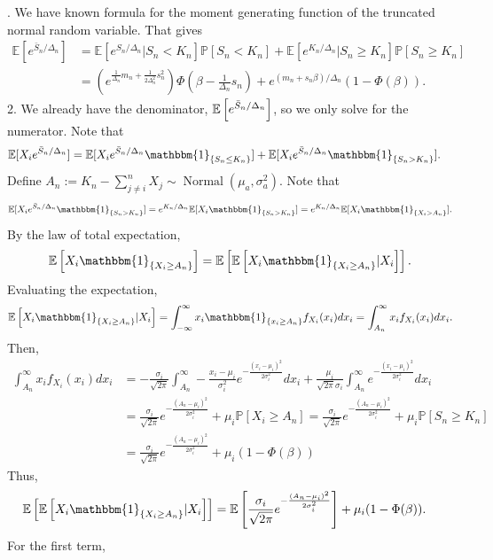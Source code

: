 \documentclass[fleqn,mnsc,nonblindrev]{informs4}
\newcommand{\ex}[1]{\mathbb{E}\left[#1\right]}
\newcommand{\Normal}{\operatorname{Normal}}
\newcommand{\EE}{\mathbb{E}}
\newcommand{\prob}[1]{\mathbb{P}[#1]}
\begin{document}
. We have known formula for the moment generating function of the truncated normal random variable. That gives
\begin{align*}
\EE[e^{\bar{S}_n/\Delta_n}]&=\mathbb{E}\left[e^{S_n/\Delta_n}|S_n<K_n\right]\mathbb{P}[S_n<K_n]+\mathbb{E}\left[e^{K_n/\Delta_n}|S_n\geq K_n\right]\mathbb{P}[S_n\geq K_n]\\
&=\left(e^{\frac{1}{\Delta_{n}}m_n+\frac{1}{2\Delta_{n}^2}s_{n}^2}\right)\Phi\left(\beta-\frac{1}{\Delta_{n}}s_{n}\right)+e^{(m_n+s_n\beta)/\Delta_n}(1-\Phi(\beta)).
\end{align*}
2. We already have the denominator, $\ex{e^{\Bar{S}_n/\Delta_n}}$, so we only solve for the numerator. Note that
\begin{align*}
\EE[X_i e^{\bar{S}_n/\Delta_n}]&=\EE[X_i e^{\bar{S}_n/\Delta_n}\mathbbm{1}_{\{S_n\leq K_n\}}]+\EE[X_i e^{\bar{S}_n/\Delta_n}\mathbbm{1}_{\{S_n>K_n\}}].
\end{align*}
Define $A_n:=K_n-\sum_{j\neq i}^nX_j\sim\Normal(\mu_a,\sigma_a^2)$. Note that
\[
\EE[X_i e^{\bar{S}_n/\Delta_n}\mathbbm{1}_{\{S_n>K_n\}}]=e^{K_n/\Delta_n}\EE[X_i\mathbbm{1}_{\{S_n>K_n\}}]=e^{K_n/\Delta_n}\EE[X_i\mathbbm{1}_{\{X_i>A_n\}}].
\]
By the law of total expectation,
\[
\ex{X_i\mathbbm{1}_{\{X_i\geq A_n\}}}=\ex{\ex{X_i\mathbbm{1}_{\{X_i\geq A_n\}}|X_i}}.
\]
Evaluating the expectation,
\[
\ex{X_i\mathbbm{1}_{\{X_i\geq A_n\}}|X_i}=\int_{-\infty}^{\infty}x_i\mathbbm{1}_{\{x_i\geq A_n\}}f_{X_i}(x_i)dx_i=\int_{A_n}^{\infty}x_if_{X_i}(x_i)dx_i.
\]
Then,
\begin{align*}
\int_{A_n}^{\infty}x_if_{X_i}(x_i)dx_i&=-\frac{\sigma_i}{\sqrt{2\pi}}\int_{A_n}^{\infty}-\frac{x_i-\mu_i}{\sigma_i^2}e^{-\frac{(x_i-\mu_i)^2}{2\sigma_i^2}}dx_i+\frac{\mu_i}{\sqrt{2\pi}\sigma_i}\int_{A_n}^{\infty}e^{-\frac{(x_i-\mu_i)^2}{2\sigma_i^2}}dx_i\\
&=\frac{\sigma_i}{\sqrt{2\pi}}e^{-\frac{(A_n-\mu_i)^2}{2\sigma_i^2}}+\mu_i\prob{X_i\geq A_n}=\frac{\sigma_i}{\sqrt{2\pi}}e^{-\frac{(A_n-\mu_i)^2}{2\sigma_i^2}}+\mu_i\prob{S_n\geq K_n}\\
&=\frac{\sigma_i}{\sqrt{2\pi}}e^{-\frac{(A_n-\mu_i)^2}{2\sigma_i^2}}+\mu_i(1-\Phi(\beta))
\end{align*}
Thus,
\begin{align*}
\ex{\ex{X_i\mathbbm{1}_{\{X_i\geq A_n\}}|X_i}}
&=\ex{\frac{\sigma_i}{\sqrt{2\pi}}e^{-\frac{(A_n-\mu_i)^2}{2\sigma_i^2}}}+\mu_i(1-\Phi(\beta)).
\end{align*}
For the first term,
\end{document}
